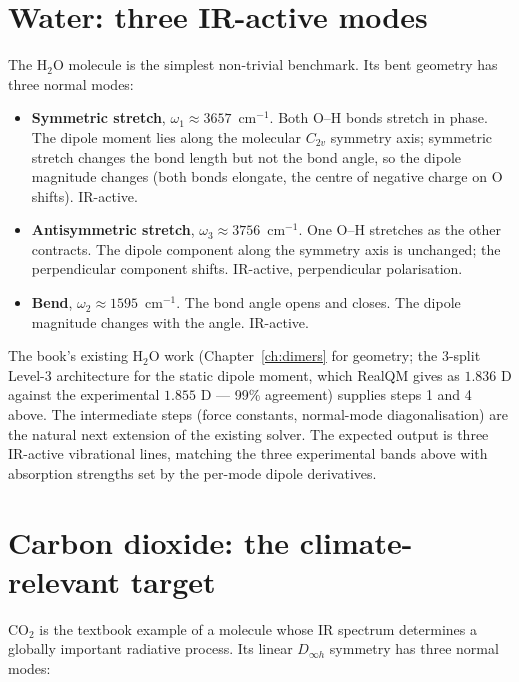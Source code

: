 \section{Water: three IR-active modes}\label{sec:molrad-water}

The H$_2$O molecule is the simplest non-trivial benchmark. Its bent geometry has three normal modes:

\begin{itemize}
\item \textbf{Symmetric stretch}, $\omega_1 \approx 3657$~cm$^{-1}$. Both O--H bonds stretch in phase. The dipole moment lies along the molecular $C_{2v}$ symmetry axis; symmetric stretch changes the bond length but not the bond angle, so the dipole magnitude changes (both bonds elongate, the centre of negative charge on O shifts). IR-active.
\item \textbf{Antisymmetric stretch}, $\omega_3 \approx 3756$~cm$^{-1}$. One O--H stretches as the other contracts. The dipole component along the symmetry axis is unchanged; the perpendicular component shifts. IR-active, perpendicular polarisation.
\item \textbf{Bend}, $\omega_2 \approx 1595$~cm$^{-1}$. The bond angle opens and closes. The dipole magnitude changes with the angle. IR-active.
\end{itemize}

The book's existing H$_2$O work (Chapter~\ref{ch:dimers} for geometry; the 3-split Level-3 architecture for the static dipole moment, which RealQM gives as $1.836$ D against the experimental $1.855$ D --- 99\% agreement) supplies steps 1 and 4 above. The intermediate steps (force constants, normal-mode diagonalisation) are the natural next extension of the existing solver. The expected output is three IR-active vibrational lines, matching the three experimental bands above with absorption strengths set by the per-mode dipole derivatives.

\section{Carbon dioxide: the climate-relevant target}\label{sec:molrad-co2}

CO$_2$ is the textbook example of a molecule whose IR spectrum determines a globally important radiative process. Its linear $D_{\infty h}$ symmetry has three normal modes:

